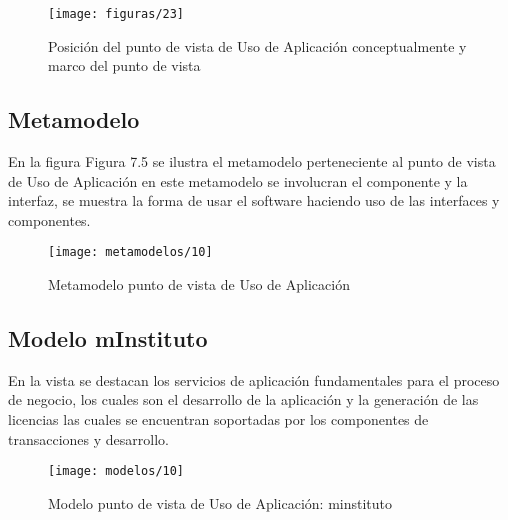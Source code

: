   \begin{figure}[H]
  	\centering
  	\texttt{[image: figuras/23]}
  	\captionsetup{width=.95\textwidth}
  	\caption{Posición del punto de vista de Uso de Aplicación conceptualmente y marco del punto de vista}
  	\label{figura23}
  \end{figure}
  
  \subsection{Metamodelo}
  En la figura Figura 7.5 se ilustra el metamodelo perteneciente al punto de vista de Uso de Aplicación en este metamodelo se involucran el componente y la interfaz, se muestra la forma de usar el software haciendo uso de las interfaces y componentes.
  
  \begin{figure}[H]
  	\centering
  	\texttt{[image: metamodelos/10]}
  	\captionsetup{width=.95\textwidth}
  	\caption{Metamodelo punto de vista de Uso de Aplicación}
  	\label{metamodelo10}
  \end{figure}
  
  \subsection{Modelo mInstituto}
  En la vista se destacan los servicios de aplicación fundamentales para el proceso de negocio, los cuales son el desarrollo de la aplicación y la generación de las licencias las cuales se encuentran soportadas por los componentes de transacciones y desarrollo.
  
  \begin{figure}[H]
  	\centering
  	\texttt{[image: modelos/10]}
  	\captionsetup{width=.95\textwidth}
  	\caption{Modelo punto de vista de Uso de Aplicación: minstituto}
  	\label{modelo10}
  \end{figure}